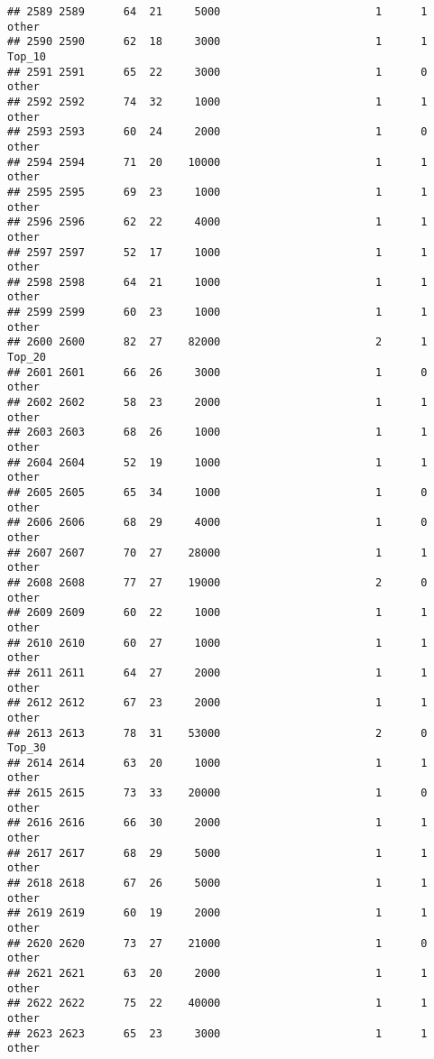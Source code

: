\documentclass[
]{article}
\begin{document}
\begin{verbatim}
## 2589 2589      64  21     5000                        1      1    other
## 2590 2590      62  18     3000                        1      1   Top_10
## 2591 2591      65  22     3000                        1      0    other
## 2592 2592      74  32     1000                        1      1    other
## 2593 2593      60  24     2000                        1      0    other
## 2594 2594      71  20    10000                        1      1    other
## 2595 2595      69  23     1000                        1      1    other
## 2596 2596      62  22     4000                        1      1    other
## 2597 2597      52  17     1000                        1      1    other
## 2598 2598      64  21     1000                        1      1    other
## 2599 2599      60  23     1000                        1      1    other
## 2600 2600      82  27    82000                        2      1   Top_20
## 2601 2601      66  26     3000                        1      0    other
## 2602 2602      58  23     2000                        1      1    other
## 2603 2603      68  26     1000                        1      1    other
## 2604 2604      52  19     1000                        1      1    other
## 2605 2605      65  34     1000                        1      0    other
## 2606 2606      68  29     4000                        1      0    other
## 2607 2607      70  27    28000                        1      1    other
## 2608 2608      77  27    19000                        2      0    other
## 2609 2609      60  22     1000                        1      1    other
## 2610 2610      60  27     1000                        1      1    other
## 2611 2611      64  27     2000                        1      1    other
## 2612 2612      67  23     2000                        1      1    other
## 2613 2613      78  31    53000                        2      0   Top_30
## 2614 2614      63  20     1000                        1      1    other
## 2615 2615      73  33    20000                        1      0    other
## 2616 2616      66  30     2000                        1      1    other
## 2617 2617      68  29     5000                        1      1    other
## 2618 2618      67  26     5000                        1      1    other
## 2619 2619      60  19     2000                        1      1    other
## 2620 2620      73  27    21000                        1      0    other
## 2621 2621      63  20     2000                        1      1    other
## 2622 2622      75  22    40000                        1      1    other
## 2623 2623      65  23     3000                        1      1    other

\end{verbatim}
\end{document}
